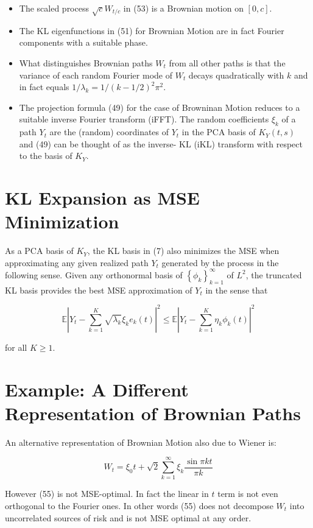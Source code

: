 \documentclass[11pt]{article}
\theoremstyle{plain} %
\theoremstyle{remark}
\begin{document}
\begin{itemize}
  \item The scaled process $\sqrt{c} W_{t / c}$ in (53) is a Brownian motion on
  $[0, c]$.

  \item The KL eigenfunctions in (51) for Brownian Motion are in fact Fourier
  components with a suitable phase.

  \item What distinguishes Brownian paths $W_{t}$ from all other paths is that
  the variance of each random Fourier mode of $W_{t}$ decays quadratically with
  $k$ and in fact equals $1 / \lambda_{k}=1 /(k-1 / 2)^{2} \pi^{2}$.

  \item The projection formula (49) for the case of Browninan Motion reduces to
  a suitable inverse Fourier transform (iFFT). The random coefficients $\xi_{k}$
  of a path $Y_{t}$ are the (random) coordinates of $Y_{t}$ in the PCA basis of
  $K_{Y}(t, s)$ and (49) can be thought of as the inverse- $\mathrm{KL}$ (iKL)
  transform with respect to the basis of $K_{Y}$.

\end{itemize}

\section*{KL Expansion as MSE Minimization}
As a PCA basis of $K_{Y}$, the KL basis in (7) also minimizes the MSE when
approximating any given realized path $Y_{t}$ generated by the process in the
following sense. Given any orthonormal basis of
$\left\{\phi_{k}\right\}_{k=1}^{\infty}$ of $L^{2}$, the truncated KL basis
provides the best MSE approximation of $Y_{t}$ in the sense that

$$
\mathbb{E}\left|Y_{t}-\sum_{k=1}^{K} \sqrt{\lambda_{k}} \xi_{k} e_{k}(t)\right|^{2} \leq \mathbb{E}\left|Y_{t}-\sum_{k=1}^{K} \eta_{k} \phi_{k}(t)\right|^{2}
$$

for all $K \geq 1$.

\section*{Example: A Different Representation of Brownian Paths}
An alternative representation of Brownian Motion also due to Wiener is:

$$
W_{t}=\xi_{0} t+\sqrt{2} \sum_{k=1}^{\infty} \xi_{k} \frac{\sin \pi k t}{\pi k}
$$

However (55) is not MSE-optimal. In fact the linear in $t$ term is not even
orthogonal to the Fourier ones. In other words (55) does not decompose $W_{t}$
into uncorrelated sources of risk and is not MSE optimal at any order.
\end{document}
